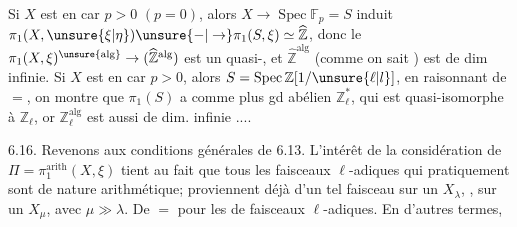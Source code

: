 
Si $X$ est en car $p>0$ $(p=0)$, alors $X\to\operatorname{Spec}\mathbb{F}_p=S$ induit   $\pi_1(X,\unsure{\xi|\eta})\unsure{-|\to}\pi_1(S,\xi)\simeq\widehat{\mathbb{Z}}$, donc le $\pi_1(X,\xi)^{\unsure{\mathrm{alg}}}\to(\widehat{\mathbb{Z}}^{\mathrm{alg}})$ est un quasi-, et $\widehat{\mathbb{Z}}^{\mathrm{alg}}$ (comme on sait ) est de dim infinie. Si $X$ est en car $p>0$, alors  $S=\operatorname{Spec}\mathbb{Z}[1/\unsure{\ell|l}]$,  en raisonnant de $=$, on montre que $\pi_1(S)$ a  comme plus gd  abélien $\mathbb{Z}_\ell^*$, qui est quasi-isomorphe à $\mathbb{Z}_\ell$, or $\mathbb{Z}_\ell^{\mathrm{alg}}$ est aussi de dim. infinie ....

6.16. Revenons aux conditions générales de 6.13. L'intérêt de la considération de \deleted{\unsure{\(\Pi\)}} $\Pi=\pi_1^{\mathrm{arith}}(X,\xi)$ tient au fait que tous les faisceaux $\ell$-adiques  qui  pratiquement sont de nature arithmétique;  proviennent déjà d'un tel faisceau sur un $X_\lambda$,  , sur un $X_\mu$, avec $\mu\gg\lambda$.  De $=$ pour les  de faisceaux $\ell$-adiques. En d'autres termes,
